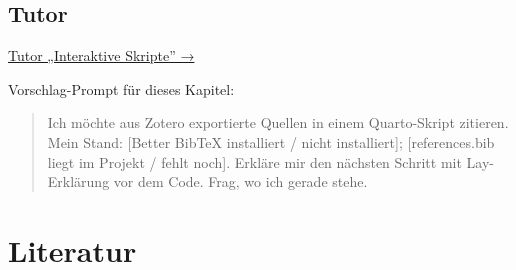\documentclass[
  ngerman,
  a4paper,
  DIV=11]{scrreprt}
\begin{document}
\section{Tutor}\label{tutor-2}

\begin{tcolorbox}[enhanced jigsaw, opacitybacktitle=0.6, leftrule=.75mm, title=\textcolor{quarto-callout-tip-color}{\faLightbulb}\hspace{0.5em}{Tutor öffnen}, colframe=quarto-callout-tip-color-frame, arc=.35mm, toprule=.15mm, colbacktitle=quarto-callout-tip-color!10!white, bottomrule=.15mm, colback=white, rightrule=.15mm, breakable, toptitle=1mm, bottomtitle=1mm, opacityback=0, titlerule=0mm, coltitle=black, left=2mm]

\href{https://chatgpt.com/g/g-69fec93348108191af1ffb8ce0cf6712-tutor-interaktive-skripte}{Tutor
„Interaktive Skripte'' →}

Vorschlag-Prompt für dieses Kapitel:

\begin{quote}
Ich möchte aus Zotero exportierte Quellen in einem Quarto-Skript
zitieren. Mein Stand: {[}Better BibTeX installiert / nicht
installiert{]}; {[}references.bib liegt im Projekt / fehlt noch{]}.
Erkläre mir den nächsten Schritt mit Lay-Erklärung vor dem Code. Frag,
wo ich gerade stehe.
\end{quote}

\end{tcolorbox}

\chapter*{Literatur}\label{literatur-2}

\end{document}
